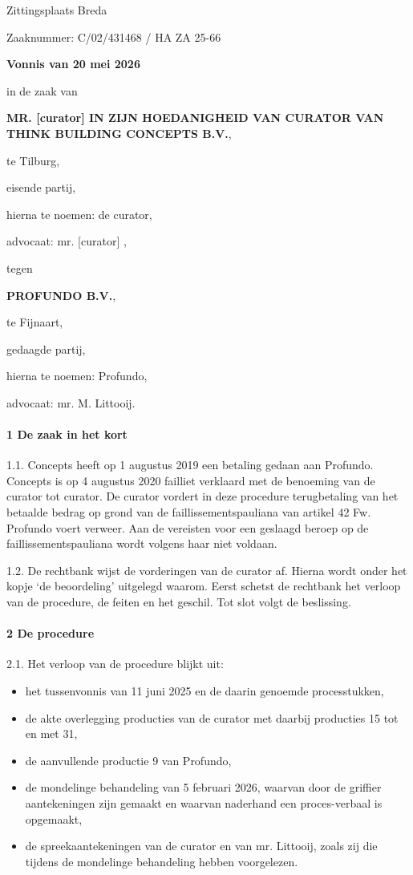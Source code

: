 \documentclass[
  dutch,
  a4paper,
]{article}
\begin{document}
Zittingsplaats Breda

Zaaknummer: C/02/431468 / HA ZA 25-66

\textbf{Vonnis van 20 mei 2026}

in de zaak van

\textbf{MR. {[}curator{]} IN ZIJN HOEDANIGHEID VAN CURATOR VAN THINK BUILDING CONCEPTS B.V.},

te Tilburg,

eisende partij,

hierna te noemen: de curator,

advocaat: mr. {[}curator{]} ,

tegen

\textbf{PROFUNDO B.V.},

te Fijnaart,

gedaagde partij,

hierna te noemen: Profundo,

advocaat: mr. M. Littooij.

\paragraph{1 De zaak in het kort}\label{de-zaak-in-het-kort-1}

1.1. Concepts heeft op 1 augustus 2019 een betaling gedaan aan Profundo. Concepts is op 4 augustus 2020 failliet verklaard met de benoeming van de curator tot curator. De curator vordert in deze procedure terugbetaling van het betaalde bedrag op grond van de faillissementspauliana van artikel 42 Fw. Profundo voert verweer. Aan de vereisten voor een geslaagd beroep op de faillissementspauliana wordt volgens haar niet voldaan.

1.2. De rechtbank wijst de vorderingen van de curator af. Hierna wordt onder het kopje `de beoordeling' uitgelegd waarom. Eerst schetst de rechtbank het verloop van de procedure, de feiten en het geschil. Tot slot volgt de beslissing.

\paragraph{2 De procedure}\label{de-procedure-1}

2.1. Het verloop van de procedure blijkt uit:

\begin{itemize}
\item
  het tussenvonnis van 11 juni 2025 en de daarin genoemde processtukken,
\item
  de akte overlegging producties van de curator met daarbij producties 15 tot en met 31,
\item
  de aanvullende productie 9 van Profundo,
\item
  de mondelinge behandeling van 5 februari 2026, waarvan door de griffier aantekeningen zijn gemaakt en waarvan naderhand een proces-verbaal is opgemaakt,
\item
  de spreekaantekeningen van de curator en van mr. Littooij, zoals zij die tijdens de mondelinge behandeling hebben voorgelezen.
\end{itemize}
\end{document}

